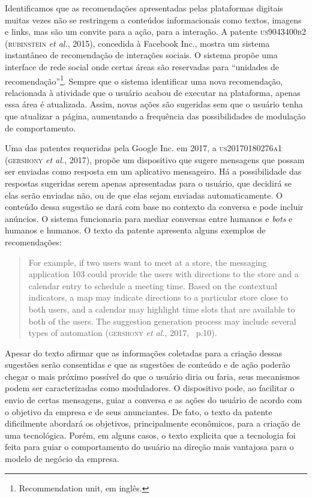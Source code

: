 Identificamos que as recomendações apresentadas pelas plataformas
digitais muitas vezes não se restringem a conteúdos informacionais como
textos, imagens e links, mas são um convite para a ação, para a
interação. A patente \textsc{us9043400b2} (\textsc{rubinstein} \emph{et al.}, 2015),
concedida à Facebook Inc., mostra um sistema instantâneo de recomendação
de interações sociais. O sistema propõe uma interface de rede social
onde certas áreas são reservadas para ``unidades de
recomendação''\footnote{Recommendation unit, em inglês.}. Sempre que o
sistema identificar uma nova recomendação, relacionada à atividade que o
usuário acabou de executar na plataforma, apenas essa área é atualizada.
Assim, novas ações são sugeridas sem que o usuário tenha que atualizar a
página, aumentando a frequência das possibilidades de modulação de
comportamento.

Uma das patentes requeridas pela Google Inc. em 2017, a \textsc{us20170180276a1}
(\textsc{gershony} \emph{et al.}, 2017), propõe um dispositivo que sugere
mensagens que possam ser enviadas como resposta em um aplicativo
mensageiro. Há a possibilidade das respostas sugeridas serem apenas
apresentadas para o usuário, que decidirá se elas serão enviadas não, ou
de que elas sejam enviadas automaticamente. O conteúdo dessa sugestão se
dará com base no contexto da conversa e pode incluir anúncios. O sistema
funcionaria para mediar conversas entre humanos e \emph{bots} e humanos
e humanos. O texto da patente apresenta alguns exemplos de
recomendações:

\begin{quote}
For example, if two users want to meet at a store, the messaging
application 103 could provide the users with directions to the store and
a calendar entry to schedule a meeting time. Based on the contextual
indicators, a map may indicate directions to a particular store close to
both users, and a calendar may highlight time slots that are available
to both of the users. The suggestion generation process may include
several types of automation (\textsc{gershony} \emph{et al.}, 2017,~ p.10).
\end{quote}

Apesar do texto afirmar que as informações coletadas para a criação
dessas sugestões serão consentidas e que as sugestões de conteúdo e de
ação poderão chegar o mais próximo possível do que o usuário diria ou
faria, seus mecanismos podem ser caracterizadas como moduladores. O
dispositivo pode, ao facilitar o envio de certas mensagens, guiar a
conversa e as ações do usuário de acordo com o objetivo da empresa e de
seus anunciantes. De fato, o texto da patente dificilmente abordará os
objetivos, principalmente econômicos, para a criação de uma tecnológica.
Porém, em alguns casos, o texto explicita que a tecnologia foi feita
para guiar o comportamento do usuário na direção mais vantajosa para o
modelo de negócio da empresa.

